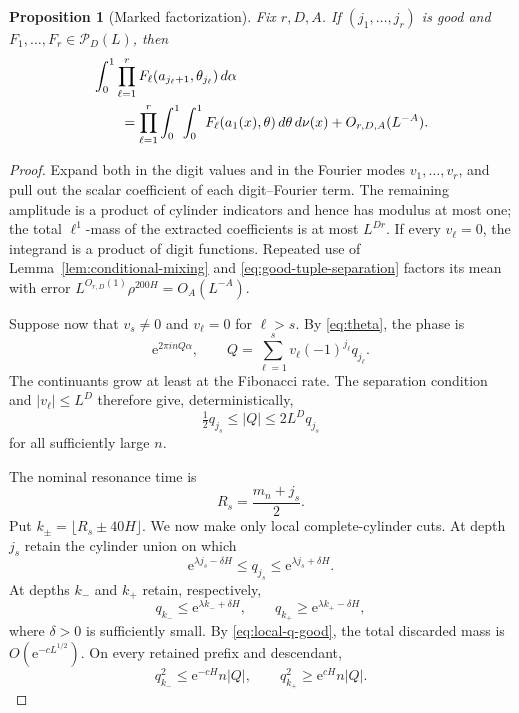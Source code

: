 \documentclass[11pt,a4paper]{amsart}
\newtheorem{proposition}[theorem]{Proposition}
\theoremstyle{definition}
\theoremstyle{remark}
\newcommand{\e}{\mathrm e}
\begin{document}
\begin{proposition}[Marked factorization]\label{prop:marked-factorization}
Fix $r,D,A$.  If $(j_1,\ldots,j_r)$ is good and
$F_1,\ldots,F_r\in\mathcal P_D(L)$, then
\begin{align}\label{eq:marked-factorization}
 &\int_0^1\prod_{\ell=1}^r
 F_\ell(a_{j_\ell+1},\theta_{j_\ell})\,d\alpha\\
 &\qquad=
 \prod_{\ell=1}^r\int_0^1\int_0^1
 F_\ell(a_1(x),\theta)\,d\theta\,d\nu(x)
 +O_{r,D,A}(L^{-A}).\notag
\end{align}
\end{proposition}

\begin{proof}
Expand both in the digit values and in the Fourier modes
$v_1,\ldots,v_r$, and pull out the scalar coefficient of each
digit--Fourier term.  The remaining amplitude is a product of cylinder
indicators and hence has modulus at most one; the total $\ell^1$-mass of the
extracted coefficients is at most $L^{Dr}$.  If every $v_\ell=0$, the
integrand is a product of digit functions.  Repeated use of
Lemma~\ref{lem:conditional-mixing} and
\eqref{eq:good-tuple-separation} factors its mean with error
$L^{O_{r,D}(1)}\rho^{200H}=O_A(L^{-A})$.

Suppose now that $v_s\ne0$ and $v_\ell=0$ for $\ell>s$.  By
\eqref{eq:theta}, the phase is
\[
 \e^{2\pi i nQ\alpha},
 \qquad
 Q=\sum_{\ell=1}^{s}v_\ell(-1)^{j_\ell}q_{j_\ell}.
\]
The continuants grow at least at the Fibonacci rate.  The separation
condition and $|v_\ell|\le L^D$ therefore give, deterministically,
\begin{equation}\label{eq:Q-dominance}
 \tfrac12q_{j_s}\le|Q|\le2L^Dq_{j_s}
\end{equation}
for all sufficiently large $n$.

The nominal resonance time is
\[
 R_s=\frac{m_n+j_s}{2}.
\]
Put $k_\pm=\lfloor R_s\pm40H\rfloor$.  We now make only local complete-cylinder
cuts.  At depth $j_s$ retain the cylinder union on which
\[
 \e^{\lambda j_s-\delta H}\le q_{j_s}
 \le \e^{\lambda j_s+\delta H}.
\]
At depths $k_-$ and $k_+$ retain, respectively,
\[
 q_{k_-}\le \e^{\lambda k_-+\delta H},\qquad
 q_{k_+}\ge \e^{\lambda k_+-\delta H},
\]
where $\delta>0$ is sufficiently small.  By
\eqref{eq:local-q-good}, the total discarded mass is
$O(\e^{-cL^{1/2}})$.  On every retained prefix and descendant,
\begin{equation}\label{eq:pre-post-resonance}
 q_{k_-}^2\le \e^{-cH}n|Q|,
 \qquad
 q_{k_+}^2\ge \e^{cH}n|Q|.
\end{equation}


\end{proof}
\end{document}
